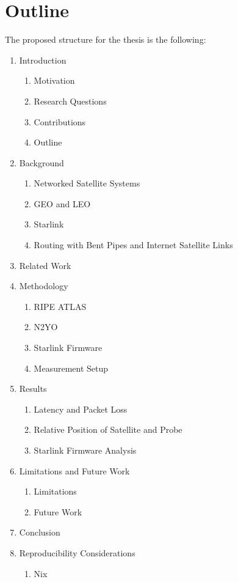 \pagebreak

\section{Outline} \label{sec:outline}

The proposed structure for the thesis is the following:

\begin{enumerate}
	\item Introduction
	      \begin{enumerate}
		      \item Motivation
		      \item Research Questions
		      \item Contributions
		      \item Outline
	      \end{enumerate}
	\item Background
	      \begin{enumerate}
		      \item Networked Satellite Systems
		      \item GEO and LEO
		      \item Starlink
		      \item Routing with Bent Pipes and Internet Satellite Links
	      \end{enumerate}
	\item Related Work
	\item Methodology
	      \begin{enumerate}
		      \item RIPE ATLAS
		      \item N2YO
		      \item Starlink Firmware
		      \item Measurement Setup
	      \end{enumerate}
	\item Results
	      \begin{enumerate}
		      \item Latency and Packet Loss
		      \item Relative Position of Satellite and Probe
		      \item Starlink Firmware Analysis
	      \end{enumerate}
	\item Limitations and Future Work
	      \begin{enumerate}
		      \item Limitations
		      \item Future Work
	      \end{enumerate}
	\item Conclusion
	\item Reproducibility Considerations
	      \begin{enumerate}
		      \item Nix
	      \end{enumerate}
\end{enumerate}
